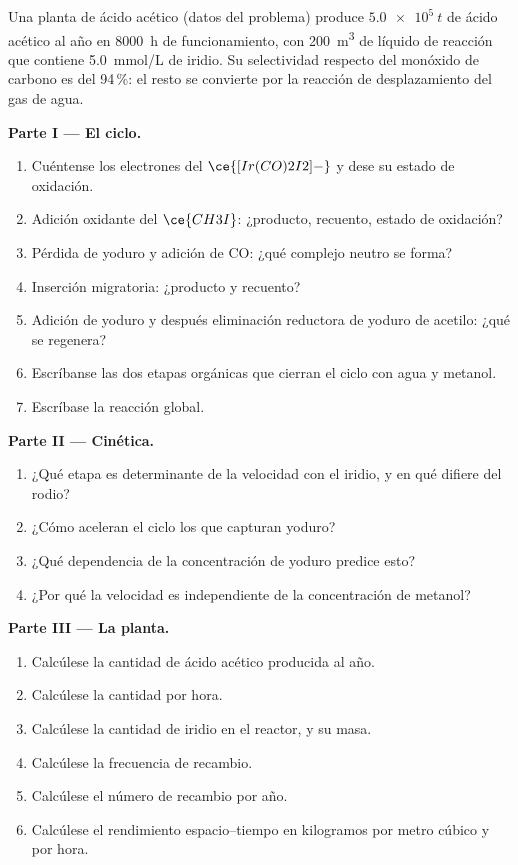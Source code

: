\begin{problem}
\label{pb:b3:homogeneous-catalysis:1}
Una planta de ácido acético (datos del problema) produce $\qty{5.0e5}{t}$ de ácido acético al año
en \qty{8000}{h} de funcionamiento, con \qty{200}{m^3} de líquido de reacción que contiene \qty{5.0}{mmol/L} de
iridio. Su selectividad respecto del monóxido de carbono es del 94\,\%: el resto se convierte por la
reacción de desplazamiento del gas de agua.

\medskip\noindent\textbf{Parte I --- El ciclo.}
\begin{enumerate}
  \item Cuéntense los electrones del $\ce{[Ir(CO)2I2]-}$ y dese su estado de oxidación.
  \item Adición oxidante del $\ce{CH3I}$: ¿producto, recuento, estado de oxidación?
  \item Pérdida de yoduro y adición de CO: ¿qué complejo neutro se forma?
  \item Inserción migratoria: ¿producto y recuento?
  \item Adición de yoduro y después eliminación reductora de yoduro de acetilo: ¿qué se
        regenera?
  \item Escríbanse las dos etapas orgánicas que cierran el ciclo con agua y metanol.
  \item Escríbase la reacción global.
\end{enumerate}

\medskip\noindent\textbf{Parte II --- Cinética.}
\begin{enumerate}[resume]
  \item ¿Qué etapa es determinante de la velocidad con el iridio, y en qué difiere del
        rodio?
  \item ¿Cómo aceleran el ciclo los  que capturan yoduro?
  \item ¿Qué dependencia de la concentración de yoduro predice esto?
  \item ¿Por qué la velocidad es independiente de la concentración de metanol?
\end{enumerate}

\medskip\noindent\textbf{Parte III --- La planta.}
\begin{enumerate}[resume]
  \item Calcúlese la cantidad de ácido acético producida al año.
  \item Calcúlese la cantidad por hora.
  \item Calcúlese la cantidad de iridio en el reactor, y su masa.
  \item Calcúlese la frecuencia de recambio.
  \item Calcúlese el número de recambio por año.
  \item Calcúlese el rendimiento espacio--tiempo en kilogramos por metro cúbico y por hora.
\end{enumerate}


\end{problem}
